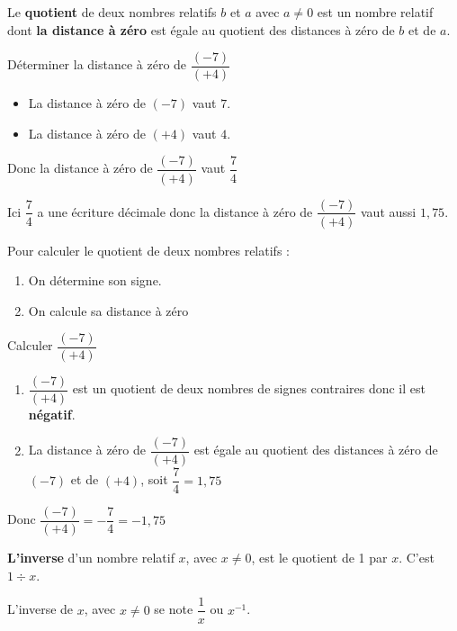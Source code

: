 \begin{propriete}
  Le \textbf{quotient} de deux nombres relatifs $b$ et $a$ avec $a\not=0$ est un nombre relatif 
  dont \textbf{la distance à zéro} est égale au quotient des distances à zéro de $b$ et de $a$.
\end{propriete}

\begin{exemple*1}
  Déterminer la distance à zéro de $\dfrac{(-7)}{(+4)}$
  \correction  
  \begin{itemize}
    \item La distance à zéro de $(-7)$ vaut $7$.
    \item La distance à zéro de $(+4)$ vaut $4$.
  \end{itemize}  
  Donc la distance à zéro de $\dfrac{(-7)}{(+4)}$ vaut $\dfrac{7}{4}$

  Ici $\dfrac{7}{4}$ a une écriture décimale donc la distance à zéro de $\dfrac{(-7)}{(+4)}$ vaut aussi $1,75$.
\end{exemple*1}

\begin{methode*1}
  Pour calculer le quotient de deux nombres relatifs :
  \begin{enumerate}
    \item On détermine son signe.
    \item On calcule sa distance à zéro
  \end{enumerate}
  \exercice
  Calculer $\dfrac{(-7)}{(+4)}$
  \correction
  \begin{enumerate}
    \item $\dfrac{(-7)}{(+4)}$ est un quotient de deux nombres de signes contraires donc il est \textbf{négatif}.
    \item La distance à zéro de $\dfrac{(-7)}{(+4)}$ est égale au quotient des distances à zéro de $(-7)$ et de $(+4)$,
    soit $\dfrac{7}{4} = 1,75$
  \end{enumerate}
  Donc $\dfrac{(-7)}{(+4)} = -\dfrac{7}{4} = -1,75$
\end{methode*1}

\begin{definition}
  \textbf{L'inverse} d'un nombre relatif $x$, avec $x\not=0$, est le quotient de 1 par $x$. C'est $1\div x$.
\end{definition}

\begin{notation}
  L'inverse de $x$, avec $x\not=0$ se note $\dfrac{1}{x}$ ou $x^{-1}$.
\end{notation} 

